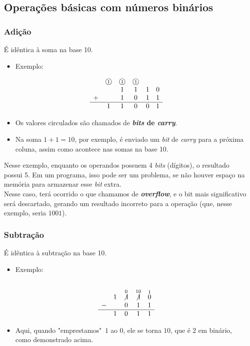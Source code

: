 \documentclass[12pt]{article}
\begin{document}
\newpage
\subsection{Operações básicas com números binários}
\subsubsection{Adição}
É idêntica à soma na base 10.
\begin{itemize}
    \item Exemplo:
\end{itemize}
\[
\begin{array}{cccccc}
& \text{\textcircled{\scriptsize1}} & \text{\textcircled{\scriptsize1}} & \text{\textcircled{\scriptsize1}} & & \\
& & 1 & 1 & 1 & 0 \\
+ & & 1 & 0 & 1 & 1 \\
\hline
& 1 & 1 & 0 & 0 & 1 \\
\end{array}
\]
\begin{itemize}
    \item [""] Os valores circulados são chamados de \textbf{\textit{bits} de \textit{carry}}.
    \item [""] Na soma $1 + 1 = 10$, por exemplo, é enviado um \textit{bit} de \textit{carry} para a próxima coluna, assim como acontece nas somas na base 10.
\end{itemize}
\begin{tcolorbox}
Nesse exemplo, enquanto os operandos possuem 4 \textit{bits} (dígitos), o resultado possui 5. Em um programa, isso pode ser um problema, se não houver espaço na memória para armazenar esse \textit{bit} extra.
\vspace{0.2cm} \\
Nesse caso, terá ocorrido o que chamamos de \textbf{\textit{overflow}}, e o bit mais significativo será descartado, gerando um resultado incorreto para a operação (que, nesse exemplo, seria $1001$).
\end{tcolorbox}

\subsubsection{Subtração}
É idêntica à subtração na base 10.
\begin{itemize}
    \item Exemplo:
\end{itemize}
\[\begin{array}{cccccc}
\\
& 1 &  \overset{0}{\not{1}} & \overset{10}{\not{1}} & \overset{1}{0} \\ -
&  & 0 & 1 & 1 \\
\hline
& 1 & 0 & 1 & 1 \\
\end{array}
\]
\begin{itemize}
    \item [""] Aqui, quando "emprestamos"\ $1$ ao $0$, ele se torna $10$, que é $2$ em binário, como demonstrado acima.
\end{itemize}
\end{document}
